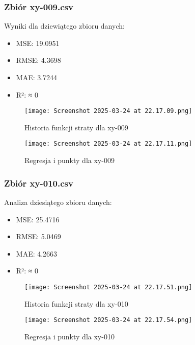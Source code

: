 \documentclass{article}
\begin{document}
\subsubsection{Zbiór xy-009.csv}
Wyniki dla dziewiątego zbioru danych:
\begin{itemize}
    \item MSE: 19.0951
    \item RMSE: 4.3698
    \item MAE: 3.7244
    \item R²: ≈ 0
\end{itemize}

\begin{figure}[H]
    \centering
    \begin{minipage}{0.45\textwidth}
        \texttt{[image: Screenshot 2025-03-24 at 22.17.09.png]}
        \caption{Historia funkcji straty dla xy-009}
    \end{minipage}
    \hfill
    \begin{minipage}{0.45\textwidth}
        \texttt{[image: Screenshot 2025-03-24 at 22.17.11.png]}
        \caption{Regresja i punkty dla xy-009}
    \end{minipage}
\end{figure}

\subsubsection{Zbiór xy-010.csv}
Analiza dziesiątego zbioru danych:
\begin{itemize}
    \item MSE: 25.4716
    \item RMSE: 5.0469
    \item MAE: 4.2663
    \item R²: ≈ 0
\end{itemize}

\begin{figure}[H]
    \centering
    \begin{minipage}{0.45\textwidth}
        \texttt{[image: Screenshot 2025-03-24 at 22.17.51.png]}
        \caption{Historia funkcji straty dla xy-010}
    \end{minipage}
    \hfill
    \begin{minipage}{0.45\textwidth}
        \texttt{[image: Screenshot 2025-03-24 at 22.17.54.png]}
        \caption{Regresja i punkty dla xy-010}
    \end{minipage}
\end{figure}
\end{document}
